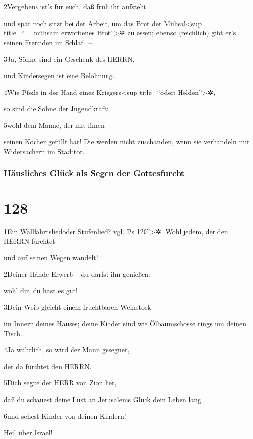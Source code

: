2Vergebens ist's für euch, daß früh ihr aufsteht

und spät noch sitzt bei der Arbeit, um das Brot der Mühsal\textless sup
title=``=~mühsam erworbenes Brot''\textgreater✲ zu essen; ebenso
(reichlich) gibt er's seinen Freunden im Schlaf.~--

3Ja, Söhne sind ein Geschenk des HERRN,

und Kindersegen ist eine Belohnung.

4Wie Pfeile in der Hand eines Kriegers\textless sup title=``oder:
Helden''\textgreater✲,

so sind die Söhne der Jugendkraft:

5wohl dem Manne, der mit ihnen

seinen Köcher gefüllt hat! Die werden nicht zuschanden, wenn sie
verhandeln mit Widersachern im Stadttor.

\hypertarget{huxe4usliches-gluxfcck-als-segen-der-gottesfurcht}{%
\subsubsection{Häusliches Glück als Segen der
Gottesfurcht}\label{huxe4usliches-gluxfcck-als-segen-der-gottesfurcht}}

\hypertarget{section-127}{%
\section{128}\label{section-127}}

1Ein Wallfahrtsliedoder Stufenlied? vgl. Ps 120''\textgreater✲. Wohl
jedem, der den HERRN fürchtet

und auf seinen Wegen wandelt!

2Deiner Hände Erwerb -- du darfst ihn genießen:

wohl dir, du hast es gut!

3Dein Weib gleicht einem fruchtbaren Weinstock

im Innern deines Hauses; deine Kinder sind wie Ölbaumschosse rings um
deinen Tisch.

4Ja wahrlich, so wird der Mann gesegnet,

der da fürchtet den HERRN.

5Dich segne der HERR von Zion her,

daß du schauest deine Lust an Jerusalems Glück dein Leben lang

6und sehest Kinder von deinen Kindern!

Heil über Israel!

